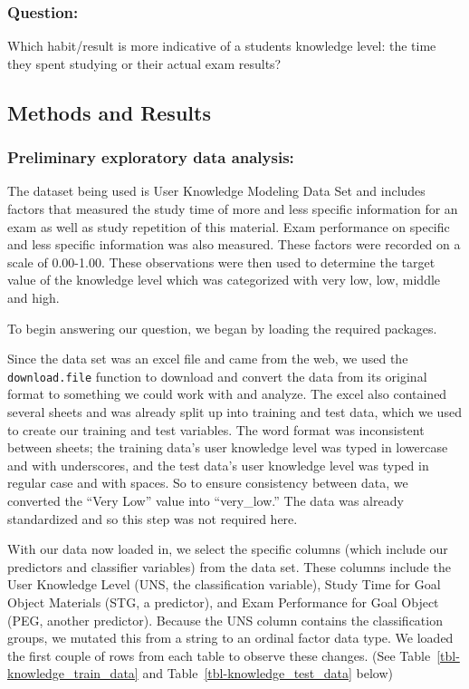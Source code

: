 \documentclass[
  letterpaper,
  DIV=11,
  numbers=noendperiod]{scrartcl}
\begin{document}
\subsubsection{Question:}\label{question}

Which habit/result is more indicative of a students knowledge level: the
time they spent studying or their actual exam results?

\subsection{\texorpdfstring{\textbf{Methods and
Results}}{Methods and Results}}\label{methods-and-results}

\subsubsection{Preliminary exploratory data
analysis:}\label{preliminary-exploratory-data-analysis}

The dataset being used is User Knowledge Modeling Data Set and includes
factors that measured the study time of more and less specific
information for an exam as well as study repetition of this material.
Exam performance on specific and less specific information was also
measured. These factors were recorded on a scale of 0.00-1.00. These
observations were then used to determine the target value of the
knowledge level which was categorized with very low, low, middle and
high.

To begin answering our question, we began by loading the required
packages.

Since the data set was an excel file and came from the web, we used the
\texttt{download.file} function to download and convert the data from
its original format to something we could work with and analyze. The
excel also contained several sheets and was already split up into
training and test data, which we used to create our training and test
variables. The word format was inconsistent between sheets; the training
data's user knowledge level was typed in lowercase and with underscores,
and the test data's user knowledge level was typed in regular case and
with spaces. So to ensure consistency between data, we converted the
``Very Low'' value into ``very\_low.'' The data was already standardized
and so this step was not required here.

With our data now loaded in, we select the specific columns (which
include our predictors and classifier variables) from the data set.
These columns include the User Knowledge Level (UNS, the classification
variable), Study Time for Goal Object Materials (STG, a predictor), and
Exam Performance for Goal Object (PEG, another predictor). Because the
UNS column contains the classification groups, we mutated this from a
string to an ordinal factor data type. We loaded the first couple of
rows from each table to observe these changes. (See
Table~\ref{tbl-knowledge_train_data} and
Table~\ref{tbl-knowledge_test_data} below)
\end{document}

